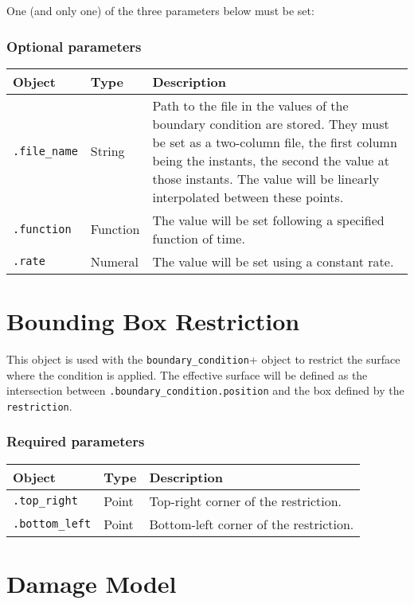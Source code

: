 \documentclass[10pt]{article}
\begin{document}
One (and only one) of the three parameters below must be set:

\subsubsection*{Optional parameters}

\begin{tabularx}{\textwidth}{llX}
\hline 
Object & Type & Description \\ 
\hline 
\verb+.file_name+ & String & Path to the file in the values of the boundary condition are stored. They must be set as a two-column file, the first column being the instants, the second the value at those instants. The value will be linearly interpolated between these points.\\ 
\verb+.function+ & Function & The value will be set following a specified function of time. \\ 
\verb+.rate+ & Numeral & The value will be set using a constant rate. \\ 
\hline 
\end{tabularx}

\section{Bounding Box Restriction}

This object is used with the \verb+boundary_condition++ object to restrict the surface where the condition is applied. The effective surface will be defined as the intersection between \verb+.boundary_condition.position+ and the box defined by the \verb+restriction+.

\subsubsection*{Required parameters}

\begin{tabularx}{\textwidth}{llX}
\hline 
Object & Type & Description \\ 
\hline 
\verb+.top_right+ & Point & Top-right corner of the restriction. \\ 
\verb+.bottom_left+ & Point & Bottom-left corner of the restriction.\\ 
\hline 
\end{tabularx}


\section{Damage Model}
\end{document}
